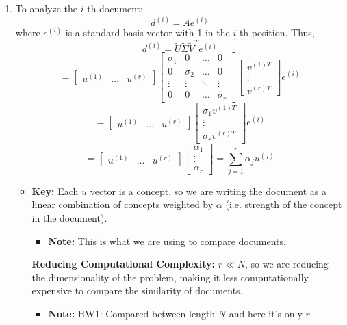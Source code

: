 \begin{example}
\begin{enumerate}
        \item To analyze the \( i \)-th document:
        \[
        d^{(i)} = A e^{(i)} 
        \]
        where \( e^{(i)} \) is a standard basis vector with 1 in the \( i \)-th position. Thus,
        \[
        d^{(i)} = \tilde{U} \tilde{\Sigma} \tilde{V}^T e^{(i)}
        \]
        \[
        = \begin{bmatrix} u^{(1)} & \ldots & u^{(r)} \end{bmatrix}
        \begin{bmatrix}
        \sigma_1 & 0 & \ldots & 0 \\
        0 & \sigma_2 & \ldots & 0 \\
        \vdots & \vdots & \ddots & \vdots \\
        0 & 0 & \ldots & \sigma_r
        \end{bmatrix}
        \begin{bmatrix} v^{(1)T} \\ \vdots \\ v^{(r)T} \end{bmatrix} e^{(i)}
        \]
        \[
        = \begin{bmatrix} u^{(1)} & \ldots & u^{(r)} \end{bmatrix}
        \begin{bmatrix} \sigma_1 v^{(1)T} \\ \vdots \\ \sigma_r v^{(r)T} \end{bmatrix} e^{(i)}
        \]
        \[
        = \begin{bmatrix} u^{(1)} & \ldots & u^{(r)} \end{bmatrix}
        \begin{bmatrix} \alpha_1 \\ \vdots \\ \alpha_r \end{bmatrix}
        = \sum_{j=1}^{r} \alpha_j u^{(j)}
        \]
        \begin{itemize}
            \item \textbf{Key:} Each $u$ vector is a concept, so we are writing the document as a linear combination of concepts weighted by $\alpha$ (i.e. strength of the concept in the document). 
            \begin{itemize}
                \item \textbf{Note:} This is what we are using to compare documents.
            \end{itemize}
            \textbf{Reducing Computational Complexity:} $r \ll N$, so we are reducing the dimensionality of the problem, making it less computationally expensive to compare the similarity of documents. 
            \begin{itemize}
                \item \textbf{Note:} HW1: Compared between length $N$ and here it's only $r$.
            \end{itemize}
        \end{itemize}


\end{enumerate}
\end{example}

